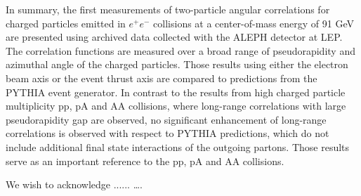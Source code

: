\documentclass[aps,prl,twocolumn,showpacs,superscriptaddress,groupedaddress]{revtex4}  %
\begin{document}


In summary, the first measurements of two-particle angular correlations for charged particles emitted in $e^+e^-$ collisions at a center-of-mass energy of 91 GeV are presented using archived data collected with the ALEPH detector at LEP. The correlation functions are measured over a broad range of pseudorapidity and azimuthal angle of the charged particles. Those results using either the electron beam axis or the event thrust axis are compared to predictions from the PYTHIA event generator. In contrast to the results from high charged particle multiplicity pp, pA and AA collisions, where long-range correlations with large pseudorapidity gap are observed, no significant enhancement of long-range correlations is observed with respect to PYTHIA predictions, which do not include additional final state interactions of the outgoing partons. Those results serve as an important reference to the
pp, pA and AA collisions.


\begin{acknowledgments}
We wish to acknowledge ......
\dots.
\end{acknowledgments}

\nocite{*}

\end{document}
